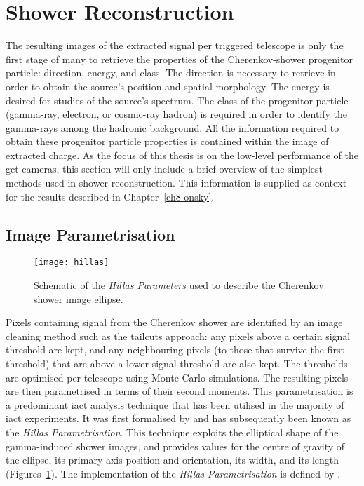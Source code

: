 \section{Shower Reconstruction}

The resulting images of the extracted signal per triggered telescope is only the first stage of many to retrieve the properties of the Cherenkov-shower progenitor particle: direction, energy, and class. The direction is necessary to retrieve in order to obtain the source's position and spatial morphology. The energy is desired for studies of the source's spectrum. The class of the progenitor particle (gamma-ray, electron, or cosmic-ray hadron) is required in order to identify the gamma-rays among the hadronic background. All the information required to obtain these progenitor particle properties is contained within the image of extracted charge. As the focus of this thesis is on the low-level performance of the \gls{gct} cameras, this section will only include a brief overview of the simplest methods used in shower reconstruction. This information is supplied as context for the results described in Chapter~\ref{ch8-onsky}.

\subsection{Image Parametrisation} \label{section:image_parametrisation}

\begin{figure}
	\centering
    \texttt{[image: hillas]} 
	\caption[Hillas Parametrisation Schematic.]{Schematic of the \textit{Hillas Parameters} used to describe the Cherenkov shower image ellipse.}
	\label{fig:hillas}
\end{figure}

Pixels containing signal from the Cherenkov shower are identified by an image cleaning method such as the tailcuts approach: any pixels above a certain signal threshold are kept, and any neighbouring pixels (to those that survive the first threshold) that are above a lower signal threshold are also kept. The thresholds are optimised per telescope using Monte Carlo simulations. The resulting pixels are then parametrised in terms of their second moments. This parametrisation is a predominant \gls{iact} analysis technique that has been utilised in the majority of \gls{iact} experiments. It was first formalised by \textcite{Hillas1985a} and has subsequently been known as the \textit{Hillas Parametrisation}. This technique exploits the elliptical shape of the gamma-induced shower images, and provides values for the centre of gravity of the ellipse, its primary axis position and orientation, its width, and its length (Figures~\ref{fig:hillas}). The  implementation of the \textit{Hillas Parametrisation} is defined by \textcite{Reynolds1993}.

